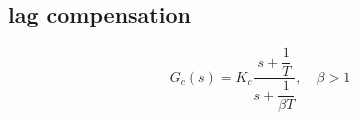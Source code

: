\subsection{lag compensation}
$$
G_c(s) = K_c\dfrac{s + \dfrac{1}{T}}{s+\dfrac{1}{\beta T}}, \quad \beta > 1
$$